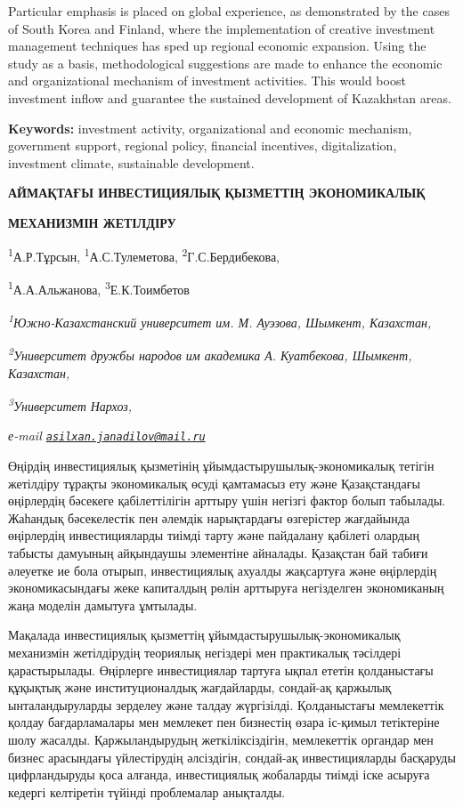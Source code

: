 Particular emphasis is placed on global experience, as demonstrated by
the cases of South Korea and Finland, where the implementation of
creative investment management techniques has sped up regional economic
expansion. Using the study as a basis, methodological suggestions are
made to enhance the economic and organizational mechanism of investment
activities. This would boost investment inflow and guarantee the
sustained development of Kazakhstan areas.

{\bfseries Keywords:} investment activity, organizational and economic
mechanism, government support, regional policy, financial incentives,
digitalization, investment climate, sustainable development.

{\bfseries АЙМАҚТАҒЫ ИНВЕСТИЦИЯЛЫҚ ҚЫЗМЕТТІҢ ЭКОНОМИКАЛЫҚ}

{\bfseries МЕХАНИЗМІН ЖЕТІЛДІРУ}

\textsuperscript{1}А.Р.Тұрсын\textsuperscript{\envelope },
\textsuperscript{1}А.С.Тулеметова, \textsuperscript{2}Г.С.Бердибекова,

\textsuperscript{1}А.А.Альжанова, \textsuperscript{3}Е.К.Тоимбетов

\emph{\textsuperscript{1}Южно-Казахстанский университет им. М. Ауэзова,
Шымкент, Казахстан,}

\emph{\textsuperscript{2}Университет дружбы народов им академика А.
Куатбекова, Шымкент, Казахстан,}

\emph{\textsuperscript{3}Университет Нархоз,}

\emph{е-mail
\href{mailto:asilxan.janadilov@mail.ru}{\nolinkurl{asilxan.janadilov@mail.ru}}}

Өңірдің инвестициялық қызметінің ұйымдастырушылық-экономикалық тетігін
жетілдіру тұрақты экономикалық өсуді қамтамасыз ету және Қазақстандағы
өңірлердің бәсекеге қабілеттілігін арттыру үшін негізгі фактор болып
табылады. Жаһандық бәсекелестік пен әлемдік нарықтардағы өзгерістер
жағдайында өңірлердің инвестицияларды тиімді тарту және пайдалану
қабілеті олардың табысты дамуының айқындаушы элементіне айналады.
Қазақстан бай табиғи әлеуетке ие бола отырып, инвестициялық ахуалды
жақсартуға және өңірлердің экономикасындағы жеке капиталдың рөлін
арттыруға негізделген экономиканың жаңа моделін дамытуға ұмтылады.

Мақалада инвестициялық қызметтің ұйымдастырушылық-экономикалық
механизмін жетілдірудің теориялық негіздері мен практикалық тәсілдері
қарастырылады. Өңірлерге инвестициялар тартуға ықпал ететін қолданыстағы
құқықтық және институционалдық жағдайларды, сондай-ақ қаржылық
ынталандыруларды зерделеу және талдау жүргізілді. Қолданыстағы
мемлекеттік қолдау бағдарламалары мен мемлекет пен бизнестің өзара
іс-қимыл тетіктеріне шолу жасалды. Қаржыландырудың жеткіліксіздігін,
мемлекеттік органдар мен бизнес арасындағы үйлестірудің әлсіздігін,
сондай-ақ инвестицияларды басқаруды цифрландыруды қоса алғанда,
инвестициялық жобаларды тиімді іске асыруға кедергі келтіретін түйінді
проблемалар анықталды.

